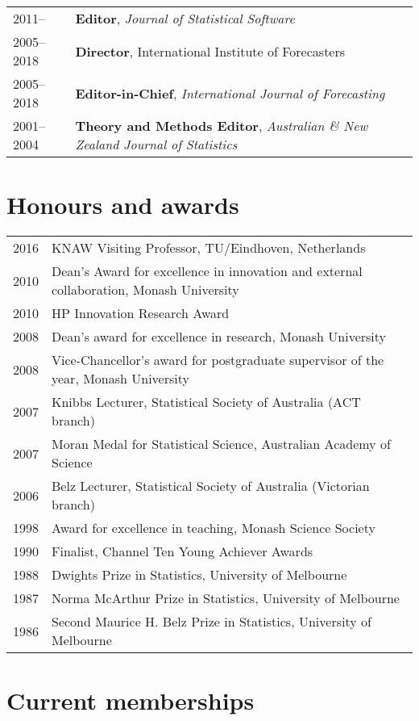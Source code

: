 \documentclass[10pt,a4paper,]{article}
\begin{document}
\begin{tabular}{ll}
  2011-- & \textbf{Editor}, \textit{Journal of Statistical Software} \\ 
  2005--2018 & \textbf{Director}, International Institute of Forecasters \\ 
  2005--2018 & \textbf{Editor-in-Chief}, \textit{International Journal of Forecasting} \\ 
  2001--2004 & \textbf{Theory and Methods Editor}, \emph{Australian \& New Zealand Journal of Statistics} \\ 
  \end{tabular}

\hypertarget{honours-and-awards}{%
\section{Honours and awards}\label{honours-and-awards}}

\begin{tabular}{rl}
  2016 & KNAW Visiting Professor, TU/Eindhoven, Netherlands \\ 
  2010 & Dean's Award for excellence in innovation and external collaboration, Monash University \\ 
  2010 & HP Innovation Research Award \\ 
  2008 & Dean's award for excellence in research, Monash University \\ 
  2008 & Vice-Chancellor's award for postgraduate supervisor of the year, Monash University \\ 
  2007 & Knibbs Lecturer, Statistical Society of Australia (ACT branch) \\ 
  2007 & Moran Medal for Statistical Science, Australian Academy of Science \\ 
  2006 & Belz Lecturer, Statistical Society of Australia (Victorian branch) \\ 
  1998 & Award for excellence in teaching, Monash Science Society \\ 
  1990 & Finalist, Channel Ten Young Achiever Awards \\ 
  1988 & Dwights Prize in Statistics, University of Melbourne \\ 
  1987 & Norma McArthur Prize in Statistics, University of Melbourne \\ 
  1986 & Second Maurice H. Belz Prize in Statistics, University of Melbourne \\ 
  \end{tabular}

\hypertarget{current-memberships}{%
\section{Current memberships}\label{current-memberships}}
\end{document}
